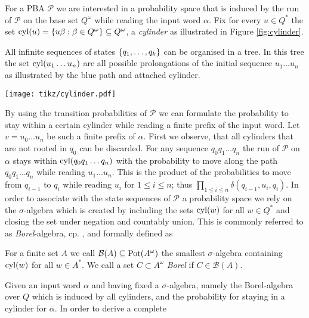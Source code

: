For a \ac{PBA} $\mathcal{P}$ we are interested in a probability space that is
induced by the run of $\mathcal{P}$ on the base set $Q^{\omega}$ while reading
the input word $\alpha$. Fix for every $u\in Q^{*}$ the set
$\operatorname{cyl}(u) = \left\{u\beta : \beta\in Q^{\omega}\right\}\subseteq Q^{\omega}$, a
\emph{cylinder} as illustrated in Figure \ref{fig:cylinder}.
\begin{drawing}
  \caption{All infinite sequences of states $\left\{q_{1},\dots, q_{k}\right\}$ can be
  organised in a tree. In this tree the set $\operatorname{cyl}(u_{1}\dots u_{n})$ are all 
  possible prolongations of the initial sequence $u_{1}\dots u_{n}$ as 
  illustrated by the blue path and attached cylinder.}
  \label{fig:cylinder}
  \begin{center}
    \texttt{[image: tikz/cylinder.pdf]}
  \end{center}
\end{drawing}
By using the transition probabilities of $\mathcal{P}$ we can formulate the
probability to stay within a certain cylinder while reading a finite prefix of
the input word. Let $v = u_{0}\dots u_{n}$ be such a finite prefix of $\alpha$.
First we observe, that all cylinders that are not rooted in $q_{0}$ can be
discarded. For any sequence $q_{0}q_{1}\dots q_{n}$ the run of $\mathcal{P}$
on $\alpha$ stays within $\operatorname{cyl}(q_{0}q_{1}\dots q_{n})$ with the probability to
move along the path $q_{0}q_{1}\dots q_{n}$ while reading $u_{1}\dots u_{n}$.
This is the product of the probabilities to move from $q_{i-1}$ to $q_{i}$
while reading $u_{i}$ for $1\leq i\leq n$; thus
$\prod_{1\leq i\leq n}\delta(q_{i-1},u_{i},q_{i})$. In order to associate with
the state sequences of $\mathcal{P}$ a probability space we rely on the 
$\sigma$-algebra which is created by including the sets $\operatorname{cyl}(w)$ for all 
$w\in Q^{*}$ and closing the set under negation and countably union. This is
commonly referred to as \emph{Borel}-algebra, cp.
\cite{RandomnessForFree,AlgorithmsForPOSG}, and formally defined as
\begin{definition}
  For a finite set $A$ we call $\mathcal{B}(A)\subseteq\operatorname{Pot}(A^{\omega})$ the 
  smallest $\sigma$-algebra containing $\operatorname{cyl}(w)$ for all $w\in A^{*}$. We call
  a set $C\subset A^{\omega}$ \emph{Borel} if $C\in\mathcal{B}(A)$.
\end{definition}
Given an input word $\alpha$ and having fixed a $\sigma$-algebra, namely the
Borel-algebra over $Q$ which is induced by all cylinders, and the probability 
for staying in a cylinder for $\alpha$. In order to derive a complete 
